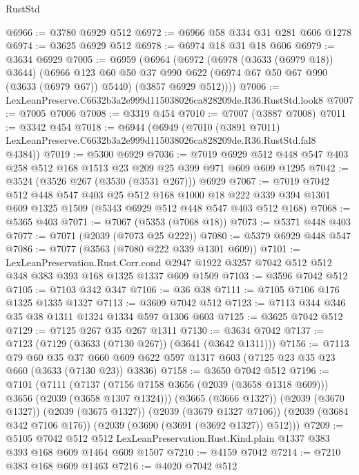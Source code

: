 \begin{lexlean}{RustStd}
\begin{coremodule}
@6966 := @3780 @6929 @512
@6972 := @6966 @58 @334 @31 @281 @606 @1278
@6974 := @3625 @6929 @512
@6978 := @6974 @18 @31 @18 @606
@6979 := @3634 @6929
@7005 := @6959
    (@6964
      (@6972
        (@6978 (@3633 (@6979 @18)) @3644)
        (@6966
          @123
          @60
          @50
          @37
          @990
          @622
          (@6974 @67 @50 @67 @990 (@3633 (@6979 @67)) @5440)
          (@3857 @6929 @512))))
@7006 := LexLeanPreserve.C6632b3a2e999d115038026ca828209de.R36.RustStd.look8
@7007 := @7005 @7006
@7008 := @3319 @454
@7010 := @7007 (@3887 @7008)
@7011 := @3342 @454
@7018 := @6944
    (@6949
      (@7010
        (@3891 @7011)
        LexLeanPreserve.C6632b3a2e999d115038026ca828209de.R36.RustStd.fal8
        @4384))
@7019 := @5300 @6929
@7036 := @7019 @6929 @512 @448 @547 @403 @258 @512 @168 @1513 @23 @209 @25 @399 @971 @609 @609 @1295
@7042 := @3524 (@3526 @267 (@3530 (@3531 @267))) @6929
@7067 := @7019
    @7042
    @512
    @448
    @547
    @403
    @25
    @512
    @168
    @1000
    @18
    @222
    @339
    @394
    @1301
    @609
    @1325
    @1509
    (@5343 @6929 @512 @448 @547 @403 @512 @168)
@7068 := @5365 @403
@7071 := @7067 (@5353 (@7068 @18))
@7073 := @5371 @448 @403
@7077 := @7071 (@2039 (@7073 @25 @222))
@7080 := @5379 @6929 @448 @547
@7086 := @7077 (@3563 (@7080 @222 @339 @1301 @609))
@7101 := LexLeanPreservation.Rust.Corr.cond
    @2947
    @1922
    @3257
    @7042
    @512
    @512
    @348
    @383
    @393
    @168
    @1325
    @1337
    @609
    @1509
@7103 := @3596 @7042 @512
@7105 := @7103 @342 @347
@7106 := @36 @38
@7111 := @7105 @7106 @176 @1325 @1335 @1327
@7113 := @3609 @7042 @512
@7123 := @7113 @344 @346 @35 @38 @1311 @1324 @1334 @597 @1306 @603
@7125 := @3625 @7042 @512
@7129 := @7125 @267 @35 @267 @1311
@7130 := @3634 @7042
@7137 := @7123 (@7129 (@3633 (@7130 @267)) (@3641 (@3642 @1311)))
@7156 := @7113
    @79
    @60
    @35
    @37
    @660
    @609
    @622
    @597
    @1317
    @603
    (@7125 @23 @35 @23 @660 (@3633 (@7130 @23)) @3836)
@7158 := @3650 @7042 @512
@7196 := @7101
    (@7111
      (@7137 (@7156 @7158 @3656 (@2039 (@3658 @1318 @609))) @3656 (@2039 (@3658 @1307 @1324)))
      (@3665 (@3666 @1327))
      (@2039 (@3670 @1327))
      (@2039 (@3675 @1327))
      (@2039 (@3679 @1327 @7106))
      (@2039 (@3684 @342 @7106 @176))
      (@2039 (@3690 (@3691 (@3692 @1327)) @512)))
@7209 := @5105
    @7042
    @512
    @512
    LexLeanPreservation.Rust.Kind.plain
    @1337
    @383
    @393
    @168
    @609
    @1464
    @609
    @1507
@7210 := @4159 @7042
@7214 := @7210 @383 @168 @609 @1463
@7216 := @4020 @7042 @512

\end{coremodule}
\end{lexlean}
